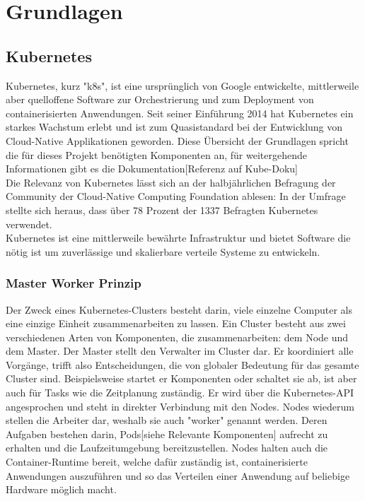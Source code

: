 \documentclass[a4paper,10pt]{scrartcl}
\begin{document}
\pagebreak

\section{Grundlagen}
\subsection{Kubernetes}

Kubernetes, kurz "k8s", ist eine ursprünglich von Google entwickelte, mittlerweile aber quelloffene Software zur Orchestrierung und zum Deployment von containerisierten Anwendungen. Seit seiner Einführung 2014 hat Kubernetes ein starkes Wachstum erlebt und ist zum Quasistandard bei der Entwicklung von Cloud-Native Applikationen geworden.
Diese Übersicht der Grundlagen spricht die für dieses Projekt benötigten Komponenten an, für weitergehende Informationen gibt es die Dokumentation[Referenz auf Kube-Doku]\\

\glqq Die Relevanz von Kubernetes lässt sich an der halbjährlichen Befragung der Community der Cloud-Native Computing Foundation ablesen:
In der Umfrage stellte sich heraus, dass über 78 Prozent der 1337 Befragten Kubernetes verwendet.\grqq \cite{.2018}\\

Kubernetes ist eine mittlerweile bewährte Infrastruktur und bietet Software die nötig ist um zuverlässige und skalierbare verteile Systeme zu entwickeln. \cite{Burns.2019} \\
\subsubsection{Master Worker Prinzip}
Der Zweck eines Kubernetes-Clusters besteht darin, viele einzelne Computer als eine einzige Einheit zusammenarbeiten zu lassen.
Ein Cluster besteht aus zwei verschiedenen Arten von Komponenten, die zusammenarbeiten:
dem Node und dem Master.
Der Master stellt den Verwalter im Cluster dar. Er koordiniert alle Vorgänge, trifft also Entscheidungen, die von globaler Bedeutung für das gesamte Cluster sind. Beispielsweise startet er Komponenten oder schaltet sie ab, ist aber auch für Tasks wie die Zeitplanung zuständig. Er wird über die Kubernetes-API angesprochen und steht in direkter Verbindung mit den Nodes.
\cite{.20200530T15:19:3404:00} \cite{.20200316T05:14:35+01:00}
Nodes wiederum stellen die Arbeiter dar, weshalb sie auch "worker" genannt werden. Deren Aufgaben bestehen darin, Pods[siehe Relevante Komponenten] aufrecht zu erhalten und die Laufzeitumgebung bereitzustellen. Nodes halten auch die Container-Runtime bereit, welche dafür zuständig ist, containerisierte Anwendungen auszuführen und so das Verteilen einer Anwendung auf beliebige Hardware möglich macht.
\end{document}
